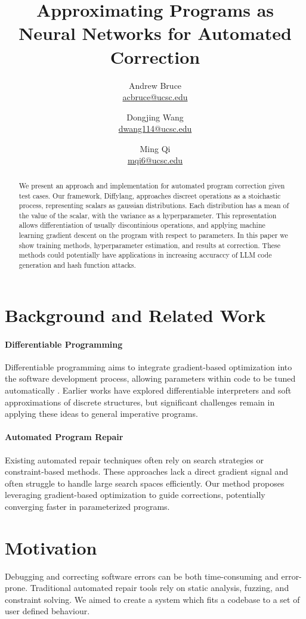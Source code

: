 \documentclass{article}
\title{Approximating Programs as Neural Networks for Automated Correction}
\author{
  Andrew Bruce \\ \href{mailto:acbruce@ucsc.edu}{acbruce@ucsc.edu}
  \and
  Dongjing Wang \\ \href{mailto:dwang114@ucsc.edu}{dwang114@ucsc.edu}
  \and
  Ming Qi \\ \href{mailto:mqi6@ucsc.edu}{mqi6@ucsc.edu}
}
\begin{document}
\maketitle

\begin{abstract}
  We present an approach and implementation for automated program correction given test cases. Our framework, Diffylang, approaches discreet operations as a stoichastic process, representing scalars as gaussian distributions. Each distribution has a mean of the value of the scalar, with the variance as a hyperparameter. This representation allows differentiation of usually discontinious operations, and applying machine learning gradient descent on the program with respect to parameters. In this paper we show training methods, hyperparameter estimation, and results at correction. These methods could potentially have applications in increasing accuraccy of LLM code generation and hash function attacks.
\end{abstract}

\section{Background and Related Work}
\paragraph{Differentiable Programming} Differentiable programming aims to integrate gradient-based optimization into the software development process, allowing parameters within code to be tuned automatically \cite{blondel2024elementsdifferentiableprogramming,DBLP:journals/corr/abs-1907-07587,vandemeulebroucke2018myia}. Earlier works have explored differentiable interpreters and soft approximations of discrete structures, but significant challenges remain in applying these ideas to general imperative programs.

\paragraph{Automated Program Repair} Existing automated repair techniques often rely on search strategies or constraint-based methods. These approaches lack a direct gradient signal and often struggle to handle large search spaces efficiently. Our method proposes leveraging gradient-based optimization to guide corrections, potentially converging faster in parameterized programs.

\section*{Motivation}
Debugging and correcting software errors can be both time-consuming and error-prone. Traditional automated repair tools rely on static analysis, fuzzing, and constraint solving. We aimed to create a system which fits a codebase to a set of user defined behaviour.
\end{document}
